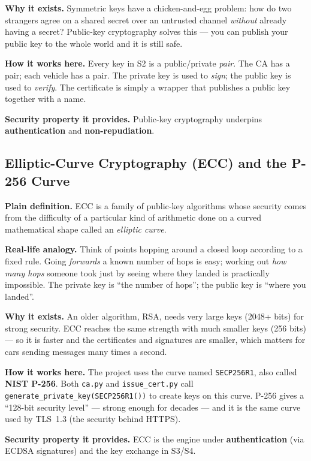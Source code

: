 \documentclass[11pt,a4paper]{report}
\begin{document}
\textbf{Why it exists.} Symmetric keys have a chicken-and-egg problem: how do two
strangers agree on a shared secret over an untrusted channel \emph{without}
already having a secret? Public-key cryptography solves this --- you can publish
your public key to the whole world and it is still safe.

\textbf{How it works here.} Every key in S2 is a public/private \emph{pair}. The
CA has a pair; each vehicle has a pair. The private key is used to \emph{sign};
the public key is used to \emph{verify}. The certificate is simply a wrapper
that publishes a public key together with a name.

\textbf{Security property it provides.} Public-key cryptography underpins
\textbf{authentication} and \textbf{non-repudiation}.

\subsection{Elliptic-Curve Cryptography (ECC) and the P-256 Curve}
\textbf{Plain definition.} ECC is a family of public-key algorithms whose
security comes from the difficulty of a particular kind of arithmetic done on a
curved mathematical shape called an \emph{elliptic curve}.

\textbf{Real-life analogy.} Think of points hopping around a closed loop
according to a fixed rule. Going \emph{forwards} a known number of hops is easy;
working out \emph{how many hops} someone took just by seeing where they landed
is practically impossible. The private key is ``the number of hops''; the public
key is ``where you landed''.

\textbf{Why it exists.} An older algorithm, RSA, needs very large keys (2048+
bits) for strong security. ECC reaches the same strength with much smaller keys
(256 bits) --- so it is faster and the certificates and signatures are smaller,
which matters for cars sending messages many times a second.

\textbf{How it works here.} The project uses the curve named \texttt{SECP256R1},
also called \textbf{NIST P-256}. Both \texttt{ca.py} and \texttt{issue\_cert.py}
call \texttt{generate\_private\_key(SECP256R1())} to create keys on this curve.
P-256 gives a ``128-bit security level'' --- strong enough for decades --- and
it is the same curve used by TLS~1.3 (the security behind HTTPS).

\textbf{Security property it provides.} ECC is the engine under
\textbf{authentication} (via ECDSA signatures) and the key exchange in S3/S4.
\end{document}
